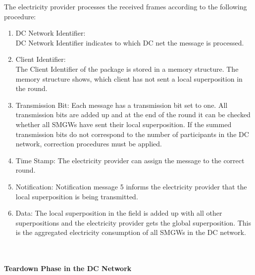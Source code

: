The electricity provider processes the received frames according to the following procedure:\\
\begin{enumerate}
\item DC Network Identifier:\\
DC Network Identifier indicates to which DC net the message is processed.
\item Client Identifier:\\
The Client Identifier of the package is stored in a memory structure. The memory structure shows, which client has not sent a local superposition in the round.
\item Transmission Bit: Each message has a transmission bit set to one. All transmission bits are added up and at the end of the round it can be checked whether all \gls{SMGW}s have sent their local superposition. If the summed transmission bits do not correspond to the number of participants in the DC network, correction procedures must be applied.
\item Time Stamp: The electricity provider can assign the message to the correct round.
\item Notification: Notification message 5 informs the electricity provider that the local superposition is being transmitted.
\item Data:
The local superposition in the field is added up with all other superpositions and the electricity provider gets the global superposition. This is the aggregated electricity consumption of all \gls{SMGW}s in the DC network.
\end{enumerate}
\\
\\
\textbf{Teardown Phase in the DC Network}
\\
\\
